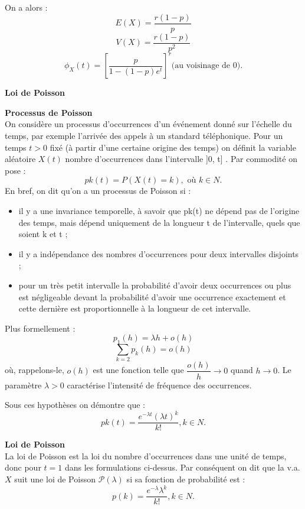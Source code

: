 \documentclass[../PolyS4.tex]{subfiles}
\begin{document}
\begin{Prop}
On a alors :
$$E(X) =\dfrac{r(1 - p)}{p}$$
$$V (X) =\dfrac{r(1 - p)}{p^2}$$
$$\phi_X(t) = \left[
\dfrac{p}{1- (1 -p)e^t} \right]^r \text{(au voisinage de $0$)} .$$
\end{Prop}

\newpage
\textbf{Loi de Poisson}



\begin{Def}\textbf{Processus de Poisson}\\
On considère un processus d'occurrences d'un événement donné sur l'échelle du temps, par exemple l'arrivée des appels à un standard téléphonique. Pour un temps $ t > 0$ fixé (à partir d'une certaine origine des temps) on définit la variable aléatoire $X(t)$ \og nombre d'occurrences dans l'intervalle ]0, t]\fg{} . Par commodité on pose :
$$pk(t) = P(X(t) = k), \text{ où }k \in N.$$
En bref, on dit qu'on a un processus de Poisson si :
\begin{itemize} 
\item il y a une invariance temporelle, à savoir que pk(t) ne dépend pas de l'origine
des temps, mais dépend uniquement de la longueur t de l'intervalle,
quels que soient k et t ;
\item il y a indépendance des nombres d'occurrences pour deux intervalles disjoints
;
\item pour un très petit intervalle la probabilité d'avoir deux occurrences ou
plus est négligeable devant la probabilité d'avoir une occurrence exactement
et cette dernière est proportionnelle à la longueur de cet intervalle.
\end{itemize}
Plus formellement :
$$p_1(h) = \lambda h + o(h)$$
$$\sum_{k=2} p_k(h) = o(h)$$
où, rappelons-le, $o(h)$ est une fonction telle que
$\dfrac{o(h)} {h}\to 0$ quand $h \to 0$.
Le paramètre $\lambda > 0$ caractérise l'intensité de fréquence des occurrences.\\
\end{Def}

Sous ces hypothèses on démontre que :
$$pk(t) =
\dfrac{e^{-\lambda t}(\lambda t)^k}{k!}
, k \in N.$$
\begin{Def}\textbf{Loi de Poisson}\\
La loi de Poisson est la loi du nombre d'occurrences dans une unité de temps, donc pour $ t = 1$ dans les formulations ci-dessus. Par conséquent on dit que la v.a. $X$ suit une loi de Poisson $\mathcal P(\lambda)$ si sa fonction de probabilité est :
$$p(k) = \dfrac{e^{-\lambda}\lambda^k} {k!} , k \in N.$$
\end{Def}
\end{document}
